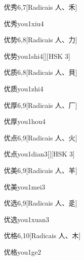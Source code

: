 \begin{entry}{优秀}{6,7}[Radicais ⼈、⽲]
  \begin{phonetics}{优秀}{you1xiu4}
  \end{phonetics}
\end{entry}

\begin{entry}{优势}{6,8}[Radicais ⼈、⼒]
  \begin{phonetics}{优势}{you1shi4}[][HSK 3]
  \end{phonetics}
\end{entry}

\begin{entry}{优质}{6,8}[Radicais ⼈、⾙]
  \begin{phonetics}{优质}{you1zhi4}
  \end{phonetics}
\end{entry}

\begin{entry}{优厚}{6,9}[Radicais ⼈、⼚]
  \begin{phonetics}{优厚}{you1hou4}
  \end{phonetics}
\end{entry}

\begin{entry}{优点}{6,9}[Radicais ⼈、⽕]
  \begin{phonetics}{优点}{you1dian3}[][HSK 3]
  \end{phonetics}
\end{entry}

\begin{entry}{优美}{6,9}[Radicais ⼈、⽺]
  \begin{phonetics}{优美}{you1mei3}
  \end{phonetics}
\end{entry}

\begin{entry}{优选}{6,9}[Radicais ⼈、⾡]
  \begin{phonetics}{优选}{you1xuan3}
  \end{phonetics}
\end{entry}

\begin{entry}{优格}{6,10}[Radicais ⼈、⽊]
  \begin{phonetics}{优格}{you1ge2}
  \end{phonetics}
\end{entry}

